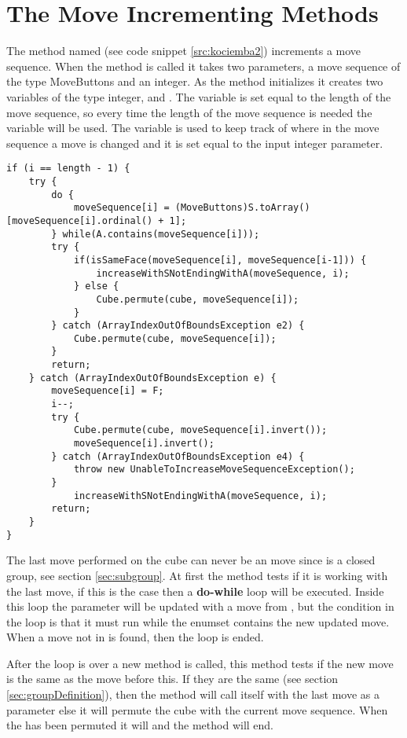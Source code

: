 \section{The Move Incrementing Methods}
\label{sec:increaseWithSNotEndingWithA}
The method named  (see code snippet \ref{src:kociemba2}) increments a move sequence.
When the method is called it takes two parameters, a move sequence of the type MoveButtons and an integer.
As the method initializes it creates two variables of the type integer,  and .
The variable  is set equal to the length of the move sequence, so every time the length of the move sequence is needed the variable  will be used.
The variable  is used to keep track of where in the move sequence a move is changed and it is set equal to the input integer parameter. 

\begin{lstlisting}[style=sourceCode, caption=\myCaption{Key point in the incrementing method of kociemba's optimal solver}, label=src:kociemba2]
if (i == length - 1) {
	try {
		do {
			moveSequence[i] = (MoveButtons)S.toArray()[moveSequence[i].ordinal() + 1];
		} while(A.contains(moveSequence[i]));
		try {
			if(isSameFace(moveSequence[i], moveSequence[i-1])) {
				increaseWithSNotEndingWithA(moveSequence, i);
			} else {
				Cube.permute(cube, moveSequence[i]);
			}
		} catch (ArrayIndexOutOfBoundsException e2) {
			Cube.permute(cube, moveSequence[i]);
		}
		return;
	} catch (ArrayIndexOutOfBoundsException e) {
		moveSequence[i] = F;
		i--;
		try {
			Cube.permute(cube, moveSequence[i].invert());
			moveSequence[i].invert();
		} catch (ArrayIndexOutOfBoundsException e4) {
			throw new UnableToIncreaseMoveSequenceException();
		}
			increaseWithSNotEndingWithA(moveSequence, i);
		return;
	}
}
\end{lstlisting}

The last move performed on the cube can never be an  move since  is a closed group, see section \ref{sec:subgroup}.
At first the method tests if it is working with the last move, if this is the case then a \textbf{do-while} loop will be executed.
Inside this loop the parameter  will be updated with a move from , but the condition in the loop is that it must run while the enumset  contains the new updated move.
When a move not in  is found, then the loop is ended.

After the loop is over a new method is called,  this method tests if the new move is the same as the move before this.
If they are the same (see section \ref{sec:groupDefinition}), then the method will call itself with the last move as a parameter else it will permute the cube with the current move sequence.
When the \rubik{} has been permuted it will  and the method will end.

